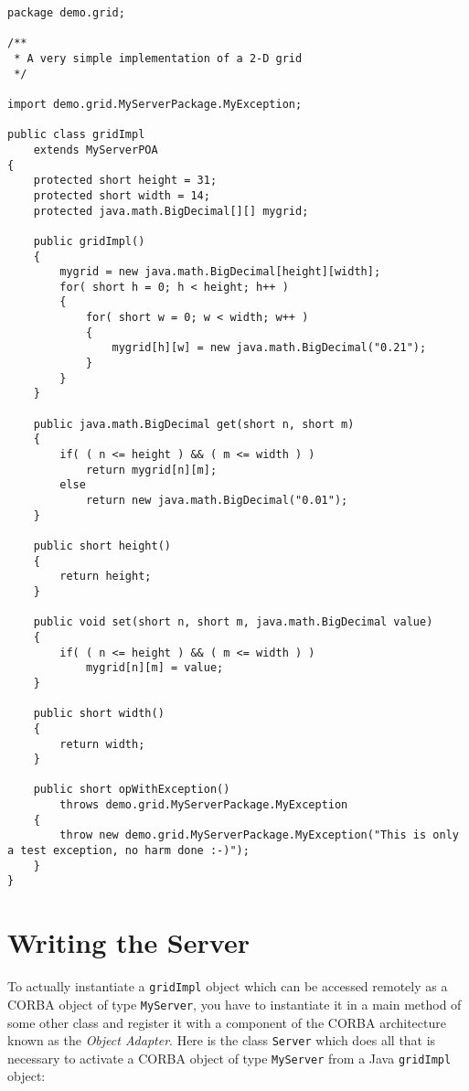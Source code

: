 \documentclass[12pt]{scrbook}
\begin{document}
\small{
\begin{verbatim}
package demo.grid;

/**
 * A very simple implementation of a 2-D grid
 */

import demo.grid.MyServerPackage.MyException;

public class gridImpl  
    extends MyServerPOA
{
    protected short height = 31;
    protected short width = 14;
    protected java.math.BigDecimal[][] mygrid;
 
    public gridImpl()
    {
        mygrid = new java.math.BigDecimal[height][width];
        for( short h = 0; h < height; h++ )
        {
            for( short w = 0; w < width; w++ )
            {
                mygrid[h][w] = new java.math.BigDecimal("0.21");
            }
        }
    }

    public java.math.BigDecimal get(short n, short m)
    {
        if( ( n <= height ) && ( m <= width ) )
            return mygrid[n][m];
        else
            return new java.math.BigDecimal("0.01");
    }

    public short height()
    {
        return height;
    }

    public void set(short n, short m, java.math.BigDecimal value)
    {
        if( ( n <= height ) && ( m <= width ) )
            mygrid[n][m] = value;
    }

    public short width()
    {
        return width;
    }

    public short opWithException()
        throws demo.grid.MyServerPackage.MyException
    {
        throw new demo.grid.MyServerPackage.MyException("This is only a test exception, no harm done :-)");
    }
}
\end{verbatim}
}

\section{Writing the Server}

To actually instantiate a {\tt  gridImpl} object which can be accessed
remotely  as  a CORBA  object  of type  {\tt  MyServer},  you have  to
instantiate it  in a main method  of some other class  and register it
with a  component of the CORBA  architecture known as  the {\it Object
Adapter}. Here is  the class {\tt Server} which  does all that is
necessary to  activate a  CORBA object of  type {\tt MyServer}  from a
Java {\tt gridImpl} object:
\end{document}
